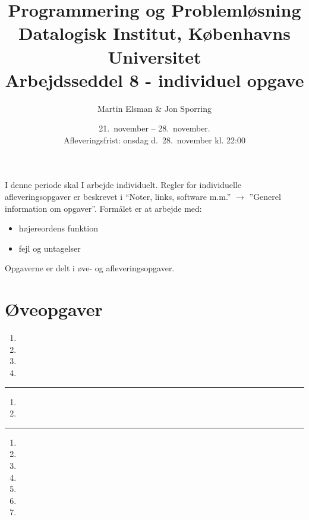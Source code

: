 \documentclass[a4paper,12pt]{article}
\title{Programmering og Problemløsning\\Datalogisk Institut,
  Københavns Universitet\\Arbejdsseddel 8 - individuel opgave}
\author{Martin Elsman \& Jon Sporring}
\date{21.\ november -- 28.\ november.\\Afleveringsfrist: onsdag d.\ 28.\ november kl. 22:00}
\begin{document}
\maketitle

\noindent
I denne periode skal I arbejde individuelt. Regler for individuelle afleveringsopgaver er beskrevet i ``Noter, links, software m.m.'' $\rightarrow$ ''Generel information om opgaver''. Formålet er at arbejde med:
\begin{itemize}
\item højereordens funktion
\item fejl og untagelser
\end{itemize}

Opgaverne er delt i øve- og afleveringsopgaver.

\section*{Øveopgaver}

\begin{enumerate}[label=8ø.\arabic*,start=0]
\item 
\item 
\item 
\item 
\end{enumerate}

\begin{center}
\rule{0.5\linewidth}{0.4pt}
\end{center}


\begin{enumerate}[label=8ø.\arabic*,start=4]
\item 
\item 
\end{enumerate}

\begin{center}
\rule{0.5\linewidth}{0.4pt}
\end{center}


\begin{enumerate}[label=8ø.\arabic*,start=6]
\item 
\item 
\item 
\item 
\item 
\item 
\item 
\end{enumerate}
\end{document}
